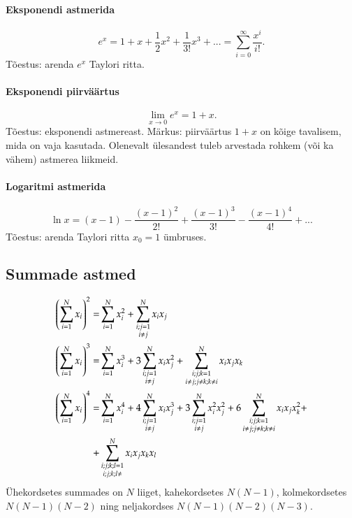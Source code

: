 \documentclass[a4paper]{article}
\numberwithin{equation}{subsection}
\begin{document}
\paragraph{Eksponendi astmerida}
\begin{equation}
 e^x = 1 + x + \frac{1}{ 2}x^2 + \frac{1}{ 3!}x^3 + ... = \sum^\infty_{i=0}
\frac{x^i }{ i!}.
\end{equation}
Tõestus: arenda $e^x$ Taylori ritta.

\paragraph{Eksponendi piirväärtus}
\begin{equation}
 \lim_{x\to 0} e^x = 1+x.
\end{equation}
Tõestus: eksponendi astmereast. Märkus: piir\-väärtus $1+x$ on kõige
tavalisem, mida on vaja kasutada. Olenevalt ülesandest tuleb arvestada
rohkem (või ka vähem) astmerea liikmeid.


\paragraph{Logaritmi astmerida}
\begin{equation}
 \ln x = (x-1) - \frac{(x-1)^2 }{ 2!} + \frac{(x-1)^3 }{ 3!} - \frac{(x-1)^4 }{
4!} + ...
\end{equation}
Tõestus: arenda Taylori ritta $x_0=1$ ümbruses.




\newpage
\subsection{Summade astmed}

\begin{align}
\left( \sum_{i=1}^N x_i \right)^2 = &
  \sum_{i=1}^N x_i^2 + \sum_{\substack{i;j=1 \\ i\ne j}}^N
  x_i x_j
  \label{eq:(sum x)^2}\\
\left( \sum_{i=1}^N x_i \right)^3 = &
  \sum_{i=1}^N x_i^3 + 3 \sum_{\substack{i;j=1 \\ i\ne j}}^N
  x_i x_j^2 + \sum_{\substack{i;j;k=1 \\ i\ne j; j\ne k; k \ne i}}^N
  x_i x_j x_k\\
\left( \sum_{i=1}^N x_i \right)^4 = &
  \sum_{i=1}^N x_i^4 +
  4\sum_{\substack{i;j=1 \\ i\ne j}}^N x_i x_j^3 +
  3\sum_{\substack{i;j=1 \\ i\ne j}}^N x_i^2 x_j^2 +
  6\sum_{\substack{i;j;k=1 \\ i\ne j; j\ne k; k \ne i}}^N
    x_i x_j x_k^2 + \notag\\
  + &
  \sum_{\substack{i;j;k;l=1\\ i;j;k;l\ne}}^N x_i x_j
    x_k x_l
\end{align}
Ühekordsetes summades on $N$ liiget, kahekordsetes $N(N-1)$,
kolmekordsetes $N(N-1)(N-2)$ ning neljakordses $N(N-1)(N-2)(N-3)$.
\end{document}
